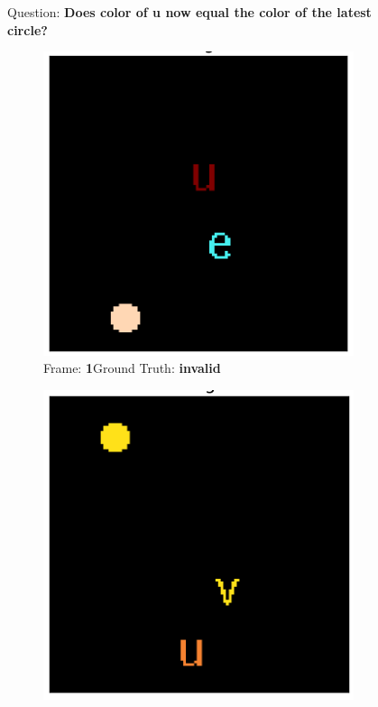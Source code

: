 \captionsetup[subfigure]{labelformat=empty}
\begin{figure}[!h]
  \begin{center}
  Question: \textbf{Does color of u now equal the color of the latest circle?}
  \end{center}
  \vskip -0.4cm
  \null\hfill
  \begin{subfigure}{0.25\textwidth}
	\includegraphics[width=0.9\linewidth]{"../img/visualization/sample 2/Frame 1"}
	\caption{Frame: \textbf{1}\newline Ground Truth: \textbf{invalid}}
	\label{fig:frame-1}
  \end{subfigure}%
  \hfill
  \begin{subfigure}{0.25\textwidth}
	\centering
	\includegraphics[width=0.9\linewidth]{"../img/visualization/sample 2/Frame 2"}

\end{subfigure}
\end{figure}
